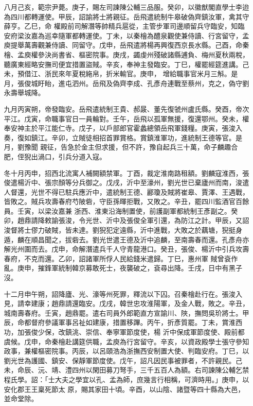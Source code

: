 \begin{pinyinscope}
 八月己亥，範宗尹薨。庚子，賜左司諫陳公輔三品服。癸卯，以徽猷閣直學士李迨為四川都轉運使。甲辰，詔諭將士將親征。岳飛遣統制牛皋破偽齊鎮汝軍，禽其守薛亨。乙巳，命
 權殿前司解潛等帥精兵扈從，主管步軍司邊順留兵守臨安，知臨安府梁汝嘉為巡幸隨軍都轉運使。丁未，以秦檜為醴泉觀使兼侍讀、行宮留守，孟庾提舉萬壽觀兼侍讀、同留守。戊申，岳飛遣將楊再興復西京長水縣。己酉，命秦檜、孟庾權參決尚書省、樞密院事。庚戌，蠲虔州殘破諸縣逋負、梅州夏秋兩稅，聽廣東經略安撫司便宜措置盜賊。辛亥，奉神主發臨安。丁巳，權罷經筵進講。己未，預借江、浙民來年夏稅絁帛，折米輸官。庚申，
 增給職事官米月三斛。是月，張俊城盱眙，進屯泗州。岳飛及偽齊李成、孔彥舟連戰至蔡州，克之，偽守劉永壽舉城降。



 九月丙寅朔，帝發臨安。岳飛遣統制王貴、郝晸、董先復虢州盧氏縣。癸酉，帝次平江。戊寅，命職事官日一員輪對。壬午，岳飛以孤軍無援，復還鄂州。癸未，權奉安神主於平江能仁寺。戊子，以戶部郎官霍蠡總領岳飛軍錢糧。庚寅，張浚入奏，復如鎮江。辛卯，立賊徒相招首罪賞格。賞鎮淮軍功，進統制王德等官。是月，劉豫聞
 親征，告急於金主但求援，但不許，豫自起兵三十萬，命子麟趣合肥，侄猊出渦口，引兵分道入寇。



 冬十月丙申，招西北流寓人補闕額禁軍。丁酉，裁定淮南路租額。劉麟寇淮西，張俊遣楊沂中、張宗顏等分兵御之。戊戌，沂中至濠州，劉光世已棄廬州而南，浚遣人督還，光世不得已駐兵應沂中，遣統制王德、酈瓊及賊將崔皋、賈澤、王遇戰，皆敗之。賊兵攻壽春府芍陂砦，守臣孫暉拒戰，又敗之。辛丑，罷四川監酒官百餘員。壬寅，以梁汝嘉兼
 浙西、淮東沿海制置使，前護副軍都統制王彥副之。癸卯，趙鼎請降敕諭張浚，令光世、沂中及張俊全軍引還，為防江之計。甲辰，又詔浚督將士僇力破賊，皆未達。劉猊犯定遠縣，沂中進戰，大敗之於藕塘，猊挺身遁，麟在順昌聞之，拔砦去。劉光世遣王德及沂中追麟，至南壽春而還。孔彥舟亦解光州圍而去。戊申，命解潛遣兵千人守青龍港口。癸丑，張俊、楊沂中引兵攻壽春府，不克而還。乙卯，詔諸軍所俘人民給錢米遣歸。丁巳，惠州軍
 賊曾袞作亂。庚申，摧鋒軍統制韓京募敢死士，夜襲破之，袞尋出降。壬戌，日中有黑子沒。



 十二月申午朔，詔降廬、光、濠等州死罪，釋流以下囚。召秦檜赴行在。張浚入見，請幸建康；趙鼎請還臨安。戊戌，韓世忠攻淮陽軍，及金人戰，敗之。辛丑，城南壽春府。壬寅，趙鼎罷。遣右司員外郎範直方宣諭川、陜，撫問吳玠將士。甲辰，命都督府參議軍事呂祉如建康，措置移蹕。丙午，折彥質罷。丁未，賞淮西功，加張俊少保，改鎮洮、崇信、奉寧軍節度使，楊
 沂中保成軍節度使、殿前都虞候。戊申，命秦檜赴講筵供職，孟庾為行宮留守。辛亥，以資政殿學士張守參知政事，兼權樞密院事。丙辰，以呂頤浩為浙撫西安制置大使、判臨安府。丁巳，以劉光世為護國、鎮安、保靜軍節度使。戊午，詔凡因民事被罪者，不許親民。己未，命辰、沅、靖、澧四州以閑田募刀弩手，三千五百人為額。右司諫陳公輔乞禁程氏學。詔：「士大夫之學宜以孔、孟為師，庶幾言行相稱，可濟時用。」庚申，以安化郡王王稟死節太
 原，賜其家田十頃。辛酉，以山陰、諸暨等四十縣為大邑，並命堂除。




\end{pinyinscope}
